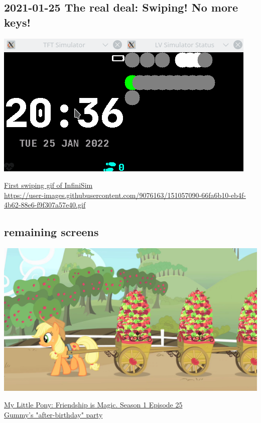 \documentclass{beamer}
\begin{document}
\subsection{2021-01-25 The real deal: Swiping! No more keys!}
\begin{frame}{}
  \centering\includegraphics[width=\textwidth]{../2022-01-25_swiping-0}

  \href{https://user-images.githubusercontent.com/9076163/151057090-66fa6b10-eb4f-4b62-88e6-f9f307a57e40.gif}{
    First swiping gif of InfiniSim\\
  \quad \small https://user-images.githubusercontent.com/9076163/151057090-66fa6b10-eb4f-4b62-88e6-f9f307a57e40.gif}
\end{frame}

\subsection{remaining screens}
\begin{frame}{}
  \includegraphics[width=\textwidth]{../pony_applejack_hauling_apples_S01E25}

  \small \href{https://mlp.fandom.com/wiki/Party_of_One/Gallery}{My Little Pony: Friendship is Magic. Season 1 Episode 25\\Gummy's "after-birthday" party}
\end{frame}
\end{document}
